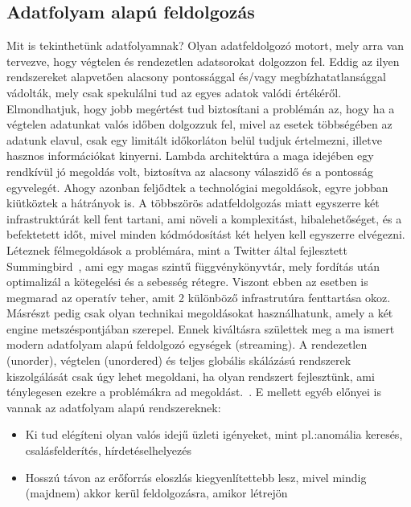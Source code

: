 \documentclass[a4paper,12pt]{article}
\begin{document}
\subsection{Adatfolyam alapú feldolgozás}
Mit is tekinthetünk adatfolyamnak? Olyan adatfeldolgozó motort, mely arra van tervezve, hogy végtelen és rendezetlen adatsorokat dolgozzon fel. Eddig az ilyen rendszereket alapvetően alacsony pontossággal és/vagy megbízhatatlansággal vádolták, mely csak spekulálni tud az egyes adatok valódi értékéről. Elmondhatjuk, hogy jobb megértést tud biztosítani a problémán az, hogy ha a végtelen adatunkat valós időben dolgozzuk fel, mivel az esetek többségében az adatunk elavul, csak egy limitált időkorláton belül tudjuk értelmezni, illetve hasznos információkat kinyerni. 
Lambda architektúra a maga idejében egy rendkívül jó megoldás volt, biztosítva az alacsony válaszidő és a pontosság egyvelegét. Ahogy azonban feljődtek a technológiai megoldások, egyre jobban kiütköztek a hátrányok is. A többszörös adatfeldolgozás miatt egyszerre két infrastruktúrát kell fent tartani, ami növeli a komplexitást, hibalehetőséget, és a befektetett időt, mivel minden kódmódosítást két helyen kell egyszerre elvégezni. Léteznek félmegoldások a problémára, mint a Twitter által fejlesztett Summingbird~\cite{summingbird}, ami egy magas szintű függvénykönyvtár, mely fordítás után optimalizál a kötegelési és a sebesség rétegre. Viszont ebben az esetben is megmarad az operatív teher, amit 2 különböző infrastrutúra fenttartása okoz. Másrészt pedig csak olyan technikai megoldásokat használhatunk, amely a két engine metszéspontjában szerepel. \linebreak
Ennek kiváltásra születtek meg a ma ismert modern adatfolyam alapú feldolgozó egységek (streaming). A rendezetlen (unorder), végtelen (unordered) és teljes globális skálázású rendszerek kiszolgálását csak úgy lehet megoldani, ha olyan rendszert fejlesztünk, ami ténylegesen ezekre a problémákra ad megoldást.~\cite{tyler}. E mellett egyéb előnyei is vannak az adatfolyam alapú rendszereknek: 
\begin{itemize}
\item Ki tud elégíteni olyan valós idejű üzleti igényeket, mint pl.:anomália keresés, csalásfelderítés, hírdetéselhelyezés
\item Hosszú távon az erőforrás eloszlás kiegyenlítettebb lesz, mivel mindig (majdnem) akkor kerül feldolgozásra, amikor létrejön
\end{itemize}
\end{document}
